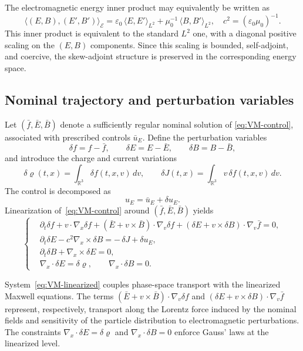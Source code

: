 \documentclass[AMA,Times2COL]{WileyNJDv5}
\begin{document}
\begin{remark}
The electromagnetic energy inner product may equivalently be written as
\[
\langle (E,B),(E',B')\rangle_{\mathcal{E}}
=
\varepsilon_0\,\langle E,E'\rangle_{L^2}
+
\mu_0^{-1}\,\langle B,B'\rangle_{L^2},
\quad
c^{2}=(\varepsilon_0\mu_0)^{-1}.
\]
This inner product is equivalent to the standard $L^2$ one, with a diagonal positive scaling on the $(E,B)$ components.
Since this scaling is bounded, self-adjoint, and coercive, the skew-adjoint structure is preserved in the corresponding energy space.
\end{remark}

\subsection{Nominal trajectory and perturbation variables}

Let $(\bar f,\bar E,\bar B)$ denote a sufficiently regular nominal solution of \eqref{eq:VM-control}, associated with prescribed controls
$\bar u_E$.
Define the perturbation variables
\[
\delta f = f - \bar f,\qquad
\delta E = E - \bar E,\qquad
\delta B = B - \bar B,
\]
and introduce the charge and current variations
\[
\delta\varrho(t,x)
=
\int_{\mathbb{R}^3}\delta f(t,x,v)\,dv,
\qquad
\delta J(t,x)
=
\int_{\mathbb{R}^3} v\,\delta f(t,x,v)\,dv.
\]
The control is decomposed as
\[
u_E = \bar u_E + \delta u_E.
\]
Linearization of~\eqref{eq:VM-control} around $(\bar f,\bar E,\bar B)$ yields
\begin{equation}\label{eq:VM-linearized}
\left\{
\begin{aligned}
&\partial_t \delta f
+ v\cdot\nabla_x \delta f
+ (\bar E + v\times \bar B)\cdot\nabla_v \delta f
+ (\delta E + v\times \delta B)\cdot\nabla_v \bar f = 0,\\[0.3em]
&\partial_t \delta E - c^2\nabla_x\times \delta B
= -\,\delta J + \delta u_E,\\[0.3em]
&\partial_t \delta B + \nabla_x\times \delta E
= 0,\\[0.3em]
&\nabla_x\!\cdot \delta E = \delta\varrho,
\qquad
\nabla_x\!\cdot \delta B = 0.
\end{aligned}
\right.
\end{equation}

System~\eqref{eq:VM-linearized} couples phase-space transport with the linearized Maxwell equations.
The terms
$(\bar E + v\times\bar B)\cdot\nabla_v \delta f$ and
$(\delta E + v\times\delta B)\cdot\nabla_v \bar f$
represent, respectively, transport along the Lorentz force induced by the
nominal fields and sensitivity of the particle distribution to electromagnetic
perturbations.
The constraints $\nabla_x\!\cdot\delta E = \delta\varrho$ and $\nabla_x\!\cdot\delta B = 0$ enforce Gauss' laws at the linearized level.
\end{document}
